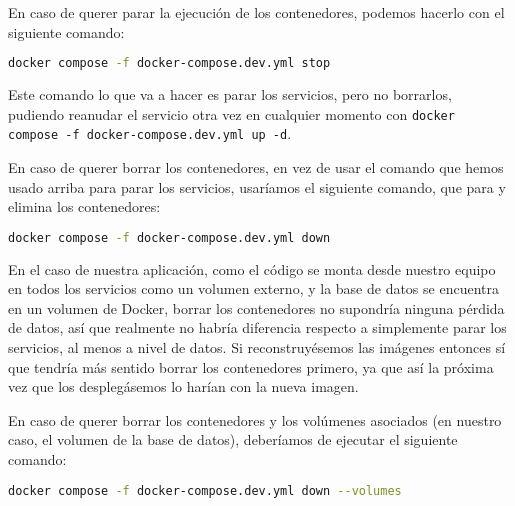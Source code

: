 En caso de querer parar la ejecución de los contenedores, podemos hacerlo con el siguiente comando:

\begin{lstlisting}[language=Bash]
  docker compose -f docker-compose.dev.yml stop
\end{lstlisting}


Este comando lo que va a hacer es parar los servicios, pero no borrarlos, pudiendo reanudar el servicio otra vez en cualquier momento con \verb,docker compose -f docker-compose.dev.yml up -d,.


En caso de querer borrar los contenedores, en vez de usar el comando que hemos usado arriba para parar los servicios, usaríamos el siguiente comando, que para y elimina los contenedores:

\begin{lstlisting}[language=Bash]
  docker compose -f docker-compose.dev.yml down
\end{lstlisting}



En el caso de nuestra aplicación, como el código se monta desde nuestro equipo en todos los servicios como un volumen externo, y la base de datos se encuentra en un volumen de Docker, borrar los contenedores no supondría ninguna pérdida de datos, así que realmente no habría diferencia respecto a simplemente parar los servicios, al menos a nivel de datos. Si reconstruyésemos las imágenes entonces sí que tendría más sentido borrar los contenedores primero, ya que así la próxima vez que los desplegásemos lo harían con la nueva imagen.


En caso de querer borrar los contenedores y los volúmenes asociados (en nuestro caso, el volumen de la base de datos), deberíamos de ejecutar el siguiente comando:

\begin{lstlisting}[language=Bash]
  docker compose -f docker-compose.dev.yml down --volumes
\end{lstlisting}

